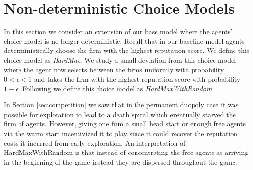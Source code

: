 \documentclass[../competing_bandits.tex]{subfiles}
\begin{document}
\section{Non-deterministic Choice Models}\label{sec:non_greedy}

In this section we consider an extension of our base model where the agents' choice model is no longer deterministic. Recall that in our baseline model agents deterministically choose the firm with the highest reputation score. We define this choice model as \textit{HardMax}. We study a small deviation from this choice model where the agent now selects between the firms uniformly with probability $0 < \epsilon < 1$ and takes the firm with the highest reputation score with probability $1 - \epsilon$. Following \cite{mansour2018competing} we define this choice model as \textit{HardMaxWithRandom}.

In Section \ref{sec:competition} we saw that in the permanent duopoly case it was possible for exploration to lead to a death spiral which eventually starved the firm of agents. However, giving one firm a small head start or enough free agents via the warm start incentivized it to play \TS since it could recover the reputation costs it incurred from early exploration. An interpretation of HardMaxWithRandom is that instead of concentrating the free agents as arriving in the beginning of the game instead they are dispersed throughout the game.
\end{document}
